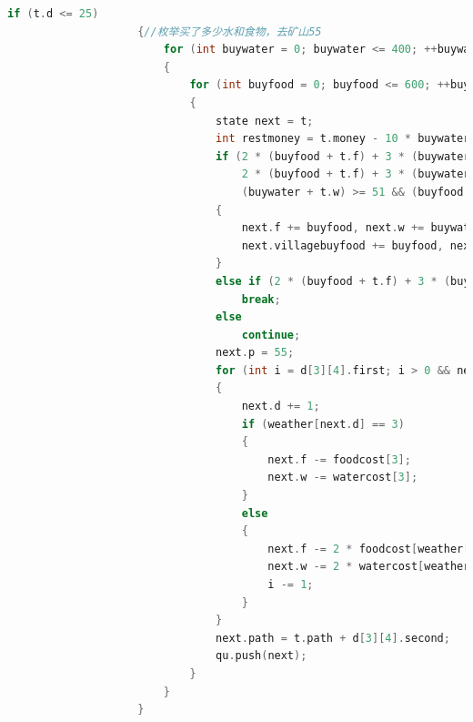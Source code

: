 \documentclass[withoutpreface,bwprint]{cumcmthesis} %
\begin{document}
\begin{appendices}
\begin{lstlisting}[language=c++]
                    if (t.d <= 25)
                    {//枚举买了多少水和食物，去矿山55
                        for (int buywater = 0; buywater <= 400; ++buywater)
                        {
                            for (int buyfood = 0; buyfood <= 600; ++buyfood)
                            {
                                state next = t;
                                int restmoney = t.money - 10 * buywater - 20 * buyfood;
                                if (2 * (buyfood + t.f) + 3 * (buywater + t.w) >= 1199 &&
                                    2 * (buyfood + t.f) + 3 * (buywater + t.w) <= 1200 && restmoney >= 0 && 
                                    (buywater + t.w) >= 51 && (buyfood + t.f) >= 54)
                                {
                                    next.f += buyfood, next.w += buywater, next.money = restmoney;
                                    next.villagebuyfood += buyfood, next.villagebuywater += buywater;
                                }
                                else if (2 * (buyfood + t.f) + 3 * (buywater + t.w) > 1200)
                                    break;
                                else
                                    continue;
                                next.p = 55;
                                for (int i = d[3][4].first; i > 0 && next.d <= 30;)
                                {
                                    next.d += 1;
                                    if (weather[next.d] == 3)
                                    {
                                        next.f -= foodcost[3];
                                        next.w -= watercost[3];
                                    }
                                    else
                                    {
                                        next.f -= 2 * foodcost[weather[next.d]];
                                        next.w -= 2 * watercost[weather[next.d]];
                                        i -= 1;
                                    }
                                }
                                next.path = t.path + d[3][4].second;
                                qu.push(next);
                            }
                        }
                    }
    

\end{lstlisting}
\end{appendices}
\end{document}
